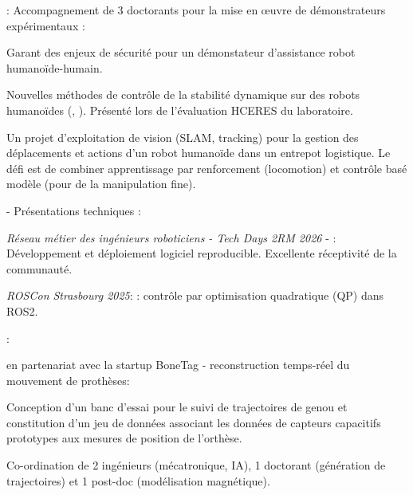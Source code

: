 \begin{cventries}
{\begin{cvitems}
\begin{subitems}
      \end{subitems}
    \item {} : Accompagnement de 3 doctorants pour la
      mise en œuvre de démonstrateurs expérimentaux :
      \begin{subitems}
      \item Garant des enjeux de sécurité pour un démonstateur d'assistance robot humanoïde-humain.
      \item Nouvelles méthodes de contrôle de la stabilité dynamique sur des robots humanoïdes
        (, ).
        Présenté lors de l'évaluation HCERES du laboratoire.
      \item Un projet d'exploitation de vision (SLAM, tracking) pour la gestion des déplacements et actions
        d'un robot humanoïde dans un entrepot logistique. Le défi est de combiner apprentissage par
        renforcement (locomotion) et contrôle basé modèle (pour de la manipulation fine).
      \end{subitems}
    \item {} - Présentations techniques :
      \begin{subitems}
      \item \emph{Réseau métier des ingénieurs roboticiens - Tech Days 2RM 2026} - : Développement et déploiement logiciel reproducible. Excellente réceptivité de la communauté.
      \item \emph{ROSCon Strasbourg 2025}: : contrôle par optimisation quadratique (QP) dans ROS2.
      \end{subitems}
    \item {}:
      \begin{subitems}
      \item {} en partenariat avec la startup BoneTag - reconstruction
        temps-réel du mouvement de prothèses:
        \begin{subitems}
        \item Conception d'un banc d'essai pour le suivi de trajectoires de genou et constitution d'un jeu de données associant les données de capteurs capacitifs prototypes aux mesures de position de l'orthèse.
        \item Co-ordination de 2 ingénieurs (mécatronique, IA), 1 doctorant (génération de trajectoires)
          et 1 post-doc (modélisation magnétique).
        \end{subitems}

\end{subitems}
\end{cvitems}}
\end{cventries}
